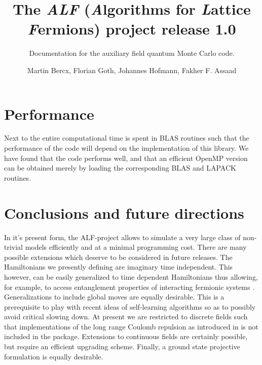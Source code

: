 \documentclass[10pt,Arial]{scrartcl}
\begin{document}
\title{
The \textit{ALF} (\textit{A}lgorithms for \textit{L}attice \textit{F}ermions) project release 1.0}
\subtitle{Documentation for the  auxiliary field quantum Monte Carlo  code.}
\author{Martin Bercx,  Florian Goth,  Johannes Hofmann, Fakher F. Assaad }
\maketitle
\tableofcontents
\clearpage








\section{Performance}
Next to the entire computational time is spent in BLAS routines such that the performance of the code will depend on the  implementation of this library. We have found that the code performs well, and that  an efficient  OpenMP  version  can be obtained merely by   loading the corresponding BLAS and LAPACK routines. 

\section{Conclusions and future directions}
In it's present form, the  ALF-project  allows to simulate a very large class of non-trivial models efficiently and at a minimal  programming cost.  There are many possible extensions which deserve to be considered in future releases.    The Hamiltonians we presently defining are imaginary time independent. This however, can be easily generalized  to time dependent Hamiltonians thus allowing, for example, to access  entanglement properties of interacting fermionic systems \cite{Broecker14,Assaad14,Assaad13a,Assaad15}. Generalizations to include global moves are equally desirable. This is a prerequisite to  play with recent ideas of self-learning algorithms  \cite{Xu16a} so as to  possibly avoid critical slowing down.  At present we are restricted to discrete fields such that  implementations  of  the long range Coulomb repulsion as introduced in \cite{Hohenadler14,Ulybyshev2013,Brower12} is not included in the package.   Extensions  to  continuous fields are certainly possible, but require an efficient upgrading scheme. Finally,  a ground state projective formulation   is equally desirable.


\end{document}
